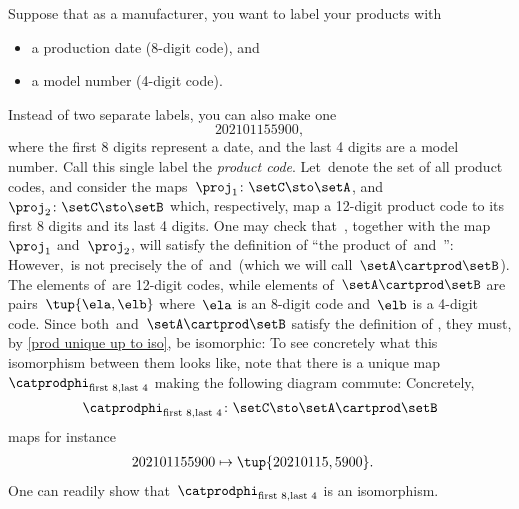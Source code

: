 \begin{example}
    \label{ex:univ-prop-prod}
    Suppose that as a manufacturer, you want to label your products with
    \begin{itemize}
        \item a production date (8-digit code), and
        \item a model number (4-digit code).
    \end{itemize}
    Instead of two separate labels, you can also make one
    \begin{equation}
        \label{eq:exa-prod-univ-prop-code}
        202101155900,
    \end{equation}
    where the first 8 digits represent a date, and the last 4 digits are a model number.
    Call this single label the \emph{product code}.
    Let~\setC denote the set of all product codes, and consider the maps~$\proj_1\colon \setC \sto \setA$, and~$\proj_2\colon \setC \sto \setB$ which, respectively, map a 12-digit product code to its first 8 digits and its last 4 digits.
    One may check that~\setC, together with the map~$\proj_1$ and~$\proj_2$, will satisfy the definition of ``the product of~\setA and~\setB'':
    However,~\setC is not precisely the  of~\setA and~\setB (which we will call~$\setA\cartprod \setB$).
    The elements of~\setC are 12-digit codes, while elements of~$\setA\cartprod \setB$ are pairs~$\tup{\ela,\elb}$ where~$\ela$ is an 8-digit code and~$\elb$ is a 4-digit code.
    Since both~\setC and~$\setA\cartprod \setB$ satisfy the definition of , they must, by \cref{prod unique up to iso}, be isomorphic:
    To see concretely what this isomorphism between them looks like, note that there is a unique map $\catprodphi_{\text{first 8},\text{last 4}}$ making the following diagram commute:
    Concretely,
    \begin{equation}
        \label{eq:exa-univ-iso}
        \catprodphi_{\text{first 8},\text{last 4}}\colon \setC \sto \setA\cartprod \setB
    \end{equation}
    maps for instance
    \begin{equation}
        \label{eq:exa-univ-iso-concrete}
        \begin{aligned}
            202101155900 & \mapsto \tup{20210115,5900}.
        \end{aligned}
    \end{equation}
    One can readily show that~$\catprodphi_{\text{first 8},\text{last 4}}$ is an isomorphism.
\end{example}

